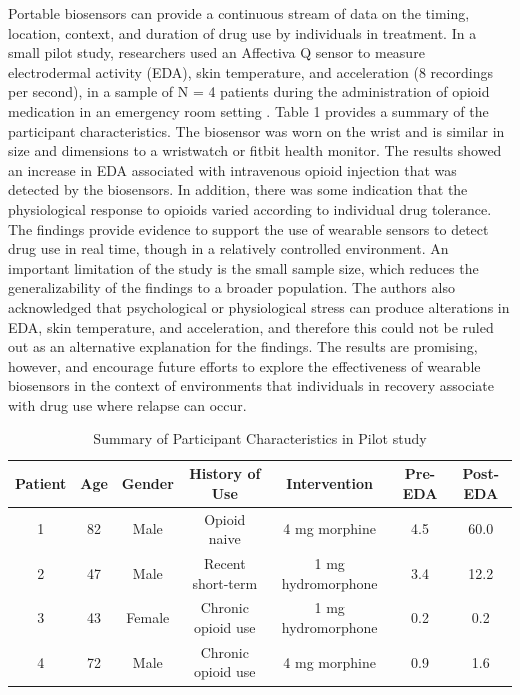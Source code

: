 \documentclass[sigconf]{acmart}
\begin{document}
Portable biosensors can provide a continuous stream of data on the timing, 
location, context, and duration of drug use by individuals in treatment. 
In a small pilot study, researchers used an Affectiva Q sensor to measure 
electrodermal activity (EDA), skin temperature, and acceleration (8 recordings 
per second), in a sample of N = 4 patients during the administration of opioid 
medication in an emergency room setting \cite{carreiro15}. Table 1 provides a 
summary of the participant characteristics. The biosensor was worn on the 
wrist and is similar in size and dimensions to a wristwatch or fitbit health
monitor. The results showed an increase in EDA associated with intravenous 
opioid injection that was detected by the biosensors. In addition, there was 
some indication that the physiological response to opioids varied according 
to individual drug tolerance. The findings provide evidence to support the 
use of wearable sensors to detect drug use in real time, though in a 
relatively controlled environment. An important limitation of the study is 
the small sample size, which reduces the generalizability of the findings to 
a broader population. The authors also acknowledged that psychological or 
physiological stress can produce alterations in EDA, skin temperature, and 
acceleration, and therefore this could not be ruled out as an alternative 
explanation for the findings. The results are promising, however, and encourage 
future efforts to explore the effectiveness of wearable biosensors in the 
context of environments that individuals in recovery associate with drug use 
where relapse can occur.

\begin{table}
  \caption{Summary of Participant Characteristics in Pilot study \cite{carreiro15}}
  \label{tab:freq}
  \begin{tabular}{ccccccc}
    \toprule
     Patient& Age& Gender& History of Use& Intervention& Pre-EDA& Post-EDA \\
    \midrule
    1& 82& Male& Opioid naive& 4 mg morphine& 4.5& 60.0 \\
    2& 47& Male& Recent short-term& 1 mg hydromorphone& 3.4& 12.2 \\
    3& 43& Female& Chronic opioid use& 1 mg hydromorphone& 0.2& 0.2 \\
    4& 72& Male& Chronic opioid use& 4 mg morphine& 0.9& 1.6 \\
    \bottomrule
  \end{tabular}
\end{table}
\end{document}
